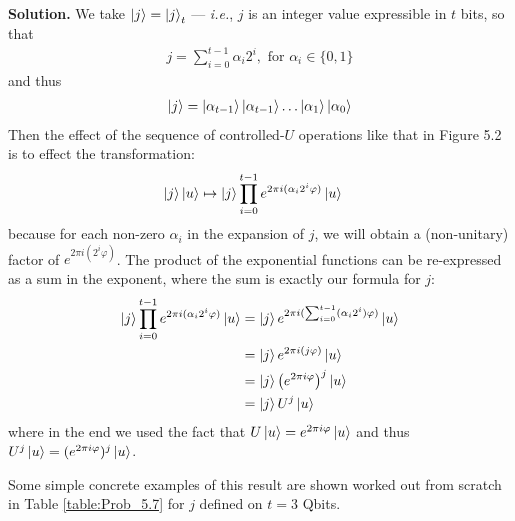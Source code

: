 \documentclass{article}
\begin{document}
\begin{enumerate}[label=\textbf{(\arabic*)}]
\textbf{Solution.} We take $\ket{j} = \ket{j}_{t}$ --- \textit{i.e.}, $j$ is an integer value expressible in $t$ bits, so that
\begin{align}
    j = \sum_{i=0}^{t-1} \alpha_i 2^i, \text{ for } \alpha_i \in \{0, 1\}
\end{align}
and thus
\begin{align}
    \ket{j} = \ket{\alpha_{t-1}}\ket{\alpha_{t-1}}\ldots\ket{\alpha_{1}}\ket{\alpha_{0}}
\end{align}
Then the effect of the sequence of controlled-$U$ operations like that in Figure 5.2 is to effect the transformation:
\begin{align}
    \ket{j}\ket{u} 
    &\mapsto
    \ket{j}\prod_{i=0}^{t-1}{e^{2\pi i (\alpha_i 2^i \varphi)}}\ket{u}
\end{align}
because for each non-zero $\alpha_i$ in the expansion of $j$, we will obtain a (non-unitary) factor of $e^{2\pi i (2^i \varphi)}$. The product of the exponential functions can be re-expressed as a sum in the exponent, where the sum is exactly our formula for $j$: 
\begin{align}
    \ket{j}\prod_{i=0}^{t-1}{e^{2\pi i (\alpha_i 2^i \varphi)}}\ket{u}
    &=
    \ket{j}{e^{2\pi i (\sum_{i=0}^{t-1}(\alpha_i 2^i) \varphi)}}\ket{u}\\
    &=
    \ket{j}{e^{2\pi i (j \varphi)}}\ket{u}\\
    &=
    \ket{j}{\left(e^{2\pi i \varphi}\right)^j}\ket{u}\\
    &=
    \ket{j}{U^j}\ket{u}\\
\end{align}
where in the end we used the fact that $U\ket{u} = e^{2\pi i \varphi}\ket{u}$ and thus $U^{j}\ket{u} = (e^{2\pi i \varphi})^j\ket{u}$.

Some simple concrete examples of this result are shown worked out from scratch in Table \ref{table:Prob_5.7} for $j$ defined on $t=3$ Qbits.


\end{enumerate}
\end{document}
